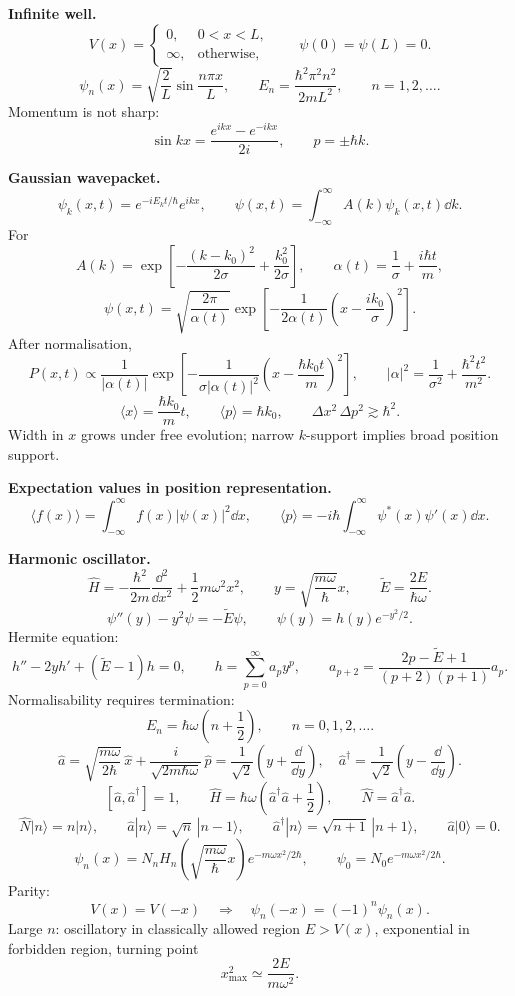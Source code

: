 \noindent\textbf{Infinite well.}
\[
V(x)=\begin{cases}0,&0<x<L,\\ \infty,&\text{otherwise},\end{cases}
\qquad
\psi(0)=\psi(L)=0.
\]
\[
\boxed{\psi_n(x)=\sqrt{\frac{2}{L}}\sin\frac{n\pi x}{L}},\qquad
\boxed{E_n=\frac{\hbar^2\pi^2n^2}{2mL^2}},\qquad n=1,2,\ldots .
\]
Momentum is not sharp:
\[
\sin kx=\frac{e^{ikx}-e^{-ikx}}{2i},\qquad p=\pm\hbar k.
\]

\noindent\textbf{Gaussian wavepacket.}
\[
\psi_k(x,t)=e^{-iE_kt/\hbar}e^{ikx},\qquad
\psi(x,t)=\int_{-\infty}^{\infty}A(k)\psi_k(x,t)\dd k.
\]
For
\[
A(k)=\exp\!\left[-\frac{(k-k_0)^2}{2\sigma}+\frac{k_0^2}{2\sigma}\right],
\qquad
\alpha(t)=\frac{1}{\sigma}+\frac{i\hbar t}{m},
\]
\[
\psi(x,t)=\sqrt{\frac{2\pi}{\alpha(t)}}
\exp\!\left[-\frac{1}{2\alpha(t)}
\left(x-\frac{ik_0}{\sigma}\right)^2\right].
\]
After normalisation,
\[
P(x,t)\propto \frac{1}{|\alpha(t)|}
\exp\!\left[-\frac{1}{\sigma|\alpha(t)|^2}
\left(x-\frac{\hbar k_0t}{m}\right)^2\right],
\qquad
|\alpha|^2=\frac{1}{\sigma^2}+\frac{\hbar^2t^2}{m^2}.
\]
\[
\langle x\rangle=\frac{\hbar k_0}{m}t,\qquad
\langle p\rangle=\hbar k_0,\qquad
\Delta x^2\,\Delta p^2\gtrsim\hbar^2 .
\]
Width in \(x\) grows under free evolution; narrow \(k\)-support implies broad
position support.

\noindent\textbf{Expectation values in position representation.}
\[
\langle f(x)\rangle=\int_{-\infty}^{\infty}f(x)|\psi(x)|^2\dd x,\qquad
\boxed{\langle p\rangle=-i\hbar\int_{-\infty}^{\infty}\psi^*(x)\psi'(x)\dd x}.
\]

\noindent\textbf{Harmonic oscillator.}
\[
\hat H=-\frac{\hbar^2}{2m}\frac{\dd^2}{\dd x^2}+\frac{1}{2}m\omega^2x^2,\qquad
y=\sqrt{\frac{m\omega}{\hbar}}x,\qquad \widetilde E=\frac{2E}{\hbar\omega}.
\]
\[
\psi''(y)-y^2\psi=-\widetilde E\psi,\qquad
\psi(y)=h(y)e^{-y^2/2}.
\]
Hermite equation:
\[
h''-2yh'+(\widetilde E-1)h=0,\qquad
h=\sum_{p=0}^{\infty}a_py^p,\qquad
a_{p+2}=\frac{2p-\widetilde E+1}{(p+2)(p+1)}a_p.
\]
Normalisability requires termination:
\[
\boxed{E_n=\hbar\omega\left(n+\frac{1}{2}\right)},\qquad n=0,1,2,\ldots .
\]
\[
\hat a=\sqrt{\frac{m\omega}{2\hbar}}\,\hat x
+\frac{i}{\sqrt{2m\hbar\omega}}\,\hat p
=\frac{1}{\sqrt{2}}\left(y+\frac{\dd}{\dd y}\right),
\quad
\hat a^\dagger=\frac{1}{\sqrt{2}}\left(y-\frac{\dd}{\dd y}\right).
\]
\[
[\hat a,\hat a^\dagger]=1,\qquad
\hat H=\hbar\omega\left(\hat a^\dagger\hat a+\frac{1}{2}\right),\qquad
\hat N=\hat a^\dagger\hat a.
\]
\[
\hat N|n\rangle=n|n\rangle,\qquad
\hat a|n\rangle=\sqrt{n}\,|n-1\rangle,\qquad
\hat a^\dagger|n\rangle=\sqrt{n+1}\,|n+1\rangle,\qquad
\hat a|0\rangle=0.
\]
\[
\psi_n(x)=N_n H_n\!\left(\sqrt{\frac{m\omega}{\hbar}}x\right)
e^{-m\omega x^2/2\hbar},\qquad
\psi_0=N_0e^{-m\omega x^2/2\hbar}.
\]
Parity:
\[
V(x)=V(-x)\quad\Longrightarrow\quad
\psi_n(-x)=(-1)^n\psi_n(x).
\]
Large \(n\): oscillatory in classically allowed region
\(E>V(x)\), exponential in forbidden region, turning point
\[
x_{\max}^2\simeq \frac{2E}{m\omega^2}.
\]

